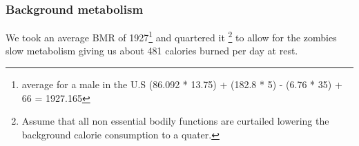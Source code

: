 \subsubsection{Background metabolism}
We took an average BMR of 1927\footnote{average for a male in the U.S (86.092 * 13.75) + (182.8 * 5) - (6.76 * 35) + 66 = 1927.165} and quartered it \footnote{Assume that all non essential bodily functions are curtailed lowering the background calorie consumption to a quater.} to allow for the zombies slow metabolism giving us about 481 calories burned per day at rest.

\clearpage
\endinput
